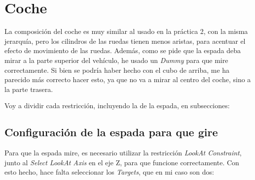\newpage

\section{Coche}

La composición del coche es muy similar al usado en la práctica 2, con la misma jerarquía, pero los cilindros de las ruedas tienen menos aristas, para acentuar el efecto de movimiento de las ruedas. Además, como se pide que la espada deba mirar a la parte superior del vehículo, he usado un \textit{Dummy} para que mire correctamente. Si bien se podría haber hecho con el cubo de arriba, me ha parecido más correcto hacer esto, ya que no va a mirar al centro del coche, sino a la parte trasera.

\bigskip

Voy a dividir cada restricción, incluyendo la de la espada, en subsecciones:


\subsection{Configuración de la espada para que gire}

Para que la espada mire, es necesario utilizar la restricción \textit{LookAt Constraint}, junto al \textit{Select LookAt Axis} en el eje Z, para que funcione correctamente. Con esto hecho, hace falta seleccionar los \textit{Targets}, que en mi caso son dos:


